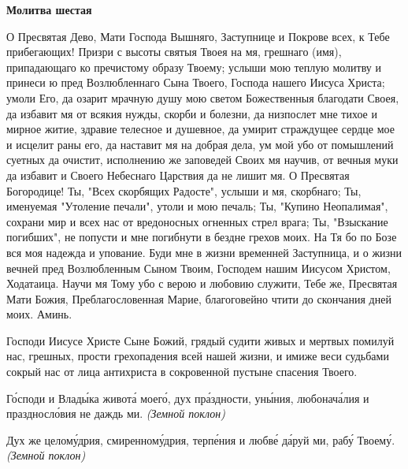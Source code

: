 \medskip


\bfseries Молитва шестая\normalfont{}


О Пресвятая Дево, Мати Господа Вышняго, Заступнице и Покрове всех, к Тебе прибегающих! Призри с высоты святыя Твоея на мя, грешнаго (имя), припадающаго ко пречистому образу Твоему; услыши мою теплую молитву и принеси ю пред Возлюбленнаго Сына Твоего, Господа нашего Иисуса Христа; умоли Его, да озарит мрачную душу мою светом Божественныя благодати Своея, да избавит мя от всякия нужды, скорби и болезни, да низпослет мне тихое и мирное житие, здравие телесное и душевное, да умирит страждущее сердце мое и исцелит раны его, да наставит мя на добрая дела, ум мой убо от помышлений суетных да очистит, исполнению же заповедей Своих мя научив, от вечныя муки да избавит и Своего Небеснаго Царствия да не лишит мя. О Пресвятая Богородице! Ты, "Всех скорбящих Радосте", услыши и мя, скорбнаго; Ты, именуемая "Утоление печали", утоли и мою печаль; Ты, "Купино Неопалимая", сохрани мир и всех нас от вредоносных огненных стрел врага; Ты, "Взыскание погибших", не попусти и мне погибнути в бездне грехов моих. На Тя бо по Бозе вся моя надежда и упование. Буди мне в жизни временней Заступница, и о жизни вечней пред Возлюбленным Сыном Твоим, Господем нашим Иисусом Христом, Ходатаица. Научи мя Тому убо с верою и любовию служити, Тебе же, Пресвятая Мати Божия, Преблагословенная Марие, благоговейно чтити до скончания дней моих. Аминь.


\mychapterending




Господи Иисусе Христе Сыне Божий, грядый судити живых и мертвых помилуй нас, грешных, прости грехопадения всей нашей жизни, и имиже веси судьбами сокрый нас от лица антихриста в сокровенной пустыне спасения Твоего.


\mychapterending





Го́споди и Влады́ка живота́ моего́, дух пра́здности, уны́ния, любонача́лия и праздносло́вия не даждь ми. \itshape (Земной поклон)\normalfont{}


Дух же целому́дрия, смиренному́дрия, терпе́ния и любве́ да́руй ми, рабу́ Твоему́. \itshape (Земной поклон)\normalfont{}


